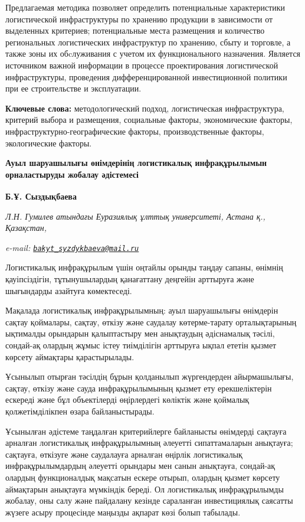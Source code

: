 Предлагаемая методика позволяет определить потенциальные характеристики
логистической инфраструктуры по хранению продукции в зависимости от
выделенных критериев; потенциальные места размещения и количество
региональных логистических инфраструктур по хранению, сбыту и торговле,
а также зоны их обcлуживания с учетом их функционального назначения.
Является источником важной информации в процессе проектирования
логистической инфраструктуры, проведения дифференцированной
инвестиционной политики при ее строительстве и эксплуатации.

{\bfseries Ключевые слова:} методологический подход, логистическая
инфраструктура, критерий выбора и размещения, социальные факторы,
экономические факторы, инфраструктурно-географические факторы,
производственные факторы, экологические факторы.

{\bfseries Ауыл шаруашылығы өнімдерінің логистикалық инфрақұрылымын
орналастыруды жобалау әдістемесі}

{\bfseries Б.Ұ. Сыздықбаева\textsuperscript{\envelope }}

\emph{Л.Н. Гумилев атындағы Еуразиялық ұлттық университеті, Астана қ.,
Қазақстан,}

\emph{e-mail:
\href{mailto:bakyt_syzdykbaeva@mail.ru}{\nolinkurl{bakyt\_syzdykbaeva@mail.ru}}}

Логистикалық инфрақұрылым үшін оңтайлы орынды таңдау сапаны, өнімнің
қауіпсіздігін, тұтынушылардың қанағаттану деңгейін арттыруға және
шығындарды азайтуға көмектеседі.

Мақалада логистикалық инфрақұрылымның: ауыл шаруашылығы өнімдерін сақтау
қоймалары, сақтау, өткізу және саудалау көтерме-тарату орталықтарының
ықтималды орындарын қалыптастыру мен анықтаудың әдіснамалық тәсілі,
сондай-ақ олардың жұмыс істеу тиімділігін арттыруға ықпал ететін қызмет
көрсету аймақтары қарастырылады.

Ұсынылып отырған тәсілдің бұрын қолданылып жүргендерден айырмашылығы,
сақтау, өткізу және сауда инфрақұрылымының қызмет ету ерекшеліктерін
ескереді және бұл объектілерді өңірлердегі көліктік және қоймалық
қолжетімділікпен өзара байланыстырады.

Ұсынылған әдістеме таңдалған критерийлерге байланысты өнімдерді сақтауға
арналған логистикалық инфрақұрылымның әлеуетті сипаттамаларын анықтауға;
сақтауға, өткізуге және саудалауға арналған өңірлік логистикалық
инфрақұрылымдардың әлеуетті орындары мен санын анықтауға, сондай-ақ
олардың функционалдық мақсатын ескере отырып, олардың қызмет көрсету
аймақтарын анықтауға мүмкіндік береді. Ол логистикалық инфрақұрылымды
жобалау, оны салу және пайдалану кезінде сараланған инвестициялық
саясатты жүзеге асыру процесінде маңызды ақпарат көзі болып табылады.

